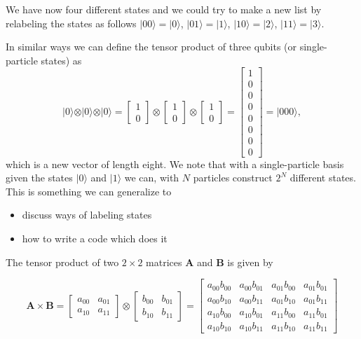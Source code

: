 We have now four different states and we could try to make a new list
by relabeling the states as follows $\vert 00 \rangle =\vert 0
\rangle$, $\vert 01 \rangle =\vert 1 \rangle$, $\vert 10 \rangle
=\vert 2 \rangle$, $\vert 11 \rangle =\vert 3 \rangle$.

In similar ways we can define the tensor product of three qubits (or single-particle states) as
\[
\vert 0 \rangle \otimes \vert 0 \rangle \otimes \vert 0 \rangle = \begin{bmatrix} 1 \\ 0\end{bmatrix} \otimes \begin{bmatrix} 1 \\ 0\end{bmatrix} \otimes \begin{bmatrix} 1 \\ 0\end{bmatrix}=\begin{bmatrix} 1 \\ 0 \\ 0 \\ 0 \\ 0 \\0 \\ 0 \\ 0\end{bmatrix}=\vert 000 \rangle, 
\]
which is a new vector of length eight. We note that with a single-particle basis given the states $\vert 0\rangle$ and $\vert 1\rangle$ we can, with $N$ particles construct $2^N$ different states.
This is something we can generalize to
\begin{itemize}
 \item discuss ways of labeling states

 \item how to write a code which does it
\end{itemize}

\noindent
The tensor product of two $2\times 2$ matrices $\bm{A}$ and $\bm{B}$ is given by

\[
\bm{A} \times \bm{B} = \begin{bmatrix} a_{00} & a_{01} \\ a_{10} & a_{11} \end{bmatrix} \otimes \begin{bmatrix} b_{00} & b_{01} \\ b_{10} & b_{11} \end{bmatrix} =
\begin{bmatrix} a_{00} b_{00} &  a_{00}b_{01} & a_{01} b_{00} & a_{01}b_{01} \\
                a_{00} b_{10} &  a_{00}b_{11} & a_{01} b_{10} & a_{01}b_{11} \\
                a_{10} b_{00} &  a_{10}b_{01} & a_{11} b_{00} & a_{11}b_{01} \\
                a_{10} b_{10} &  a_{10}b_{11} & a_{11} b_{10} & a_{11}b_{11} \end{bmatrix}
\]





